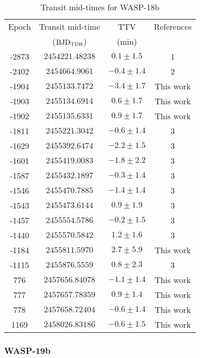 \begin{table}[H]
\centering
\caption{Transit mid-times for WASP-18b}
\label{times_wasp18}
\begin{tabular}{cccc}
\hline \hline
Epoch & Transit mid-time & TTV & References\\
      & (${\rm BJD_{TDB}}$) & (min) & \\
\hline 
-2873 & $2454221.48238$ & $0.1\pm1.5$ & 1\\
-2402 & $2454664.9061$ & $-0.4\pm1.4$ & 2 \\
-1904 & $2455133.7472$ & $-3.4\pm1.7$ & This work \\
-1903 & $2455134.6914$ & $0.6\pm1.7$ & This work \\
-1902 & $2455135.6331$  & $0.9\pm1.7$  & This work \\
-1811 & $2455221.3042$ & $-0.6\pm1.4$  & 3\\
-1629 & $2455392.6474$ & $-2.2\pm1.5$& 3 \\
-1601 & $2455419.0083$ & $-1.8\pm2.2$& 3\\
-1587 & $2455432.1897$ & $-0.3\pm1.4$ & 3\\
-1546 & $2455470.7885$ & $-1.4\pm1.4$ & 3\\
-1543 & $2455473.6144$ & $0.9\pm1.9$& 3\\
-1457 & $2455554.5786$ & $-0.2\pm1.5$&3 \\
-1440 & $2455570.5842$ & $1.2\pm1.6$& 3\\
-1184 & $2455811.5970$ &  $2.7\pm5.9$ & This work  \\
-1115 & $2455876.5559$ & $0.8\pm2.3$ & 3 \\ 
776 & $2457656.84078$ & $-1.1\pm1.4$ & This work  \\
777 & $2457657.78359$   & $0.9\pm1.4$ & This work\\
778 & $2457658.72404$ & $-0.6\pm1.4$ & This work \\
1169 & $2458026.83186$ & $-0.6\pm1.5$ & This work  \\
\hline
\end{tabular}
\end{table} 

\subsubsection{WASP-19b}

